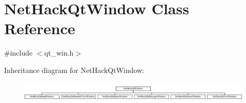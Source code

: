 \hypertarget{classNetHackQtWindow}{\section{Net\+Hack\+Qt\+Window Class Reference}
\label{classNetHackQtWindow}
}


{\ttfamily \#include $<$qt\+\_\+win.\+h$>$}

Inheritance diagram for Net\+Hack\+Qt\+Window\+:\begin{figure}[H]
\begin{center}
\leavevmode
\includegraphics[height=0.957265cm]{classNetHackQtWindow}
\end{center}
\end{figure}
